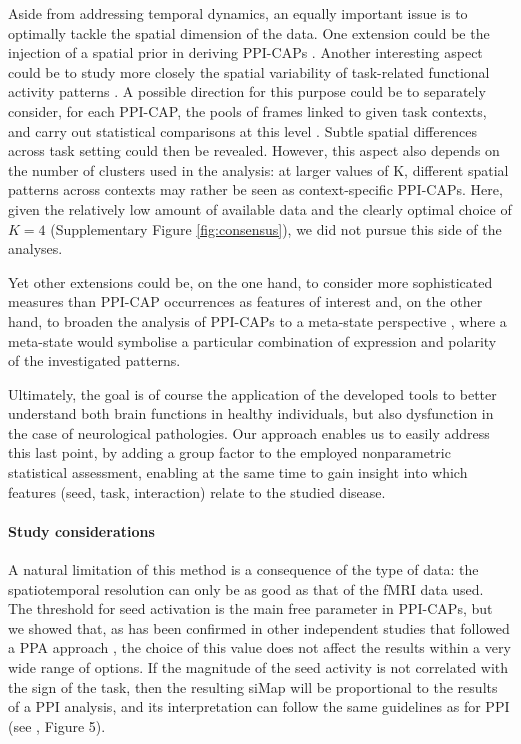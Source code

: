 Aside from addressing temporal dynamics, an equally important issue is to optimally tackle the spatial dimension of the data. One extension could be the injection of a spatial prior in deriving PPI-CAPs \citep{Zhuang2018}. Another interesting aspect could be to study more closely the spatial variability of task-related functional activity patterns \citep{Kiviniemi2011}. A possible direction for this purpose could be to separately consider, for each PPI-CAP, the pools of frames linked to given task contexts, and carry out statistical comparisons at this level \citep{Amico2014}. Subtle spatial differences across task setting could then be revealed. However, this aspect also depends on the number of clusters used in the analysis: at larger values of K, different spatial patterns across contexts may rather be seen as context-specific PPI-CAPs. Here, given the relatively low amount of available data and the clearly optimal choice of $K=4$ (Supplementary Figure \ref{fig:consensus}), we did not pursue this side of the analyses.


Yet other extensions could be, on the one hand, to consider more sophisticated measures than PPI-CAP occurrences as features of interest \citep{Chen2015} and, on the other hand, to broaden the analysis of PPI-CAPs to a meta-state perspective \citep{Miller2016,Vidaurre2017}, where a meta-state would symbolise a particular combination of expression and polarity of the investigated patterns.

Ultimately, the goal is of course the application of the developed tools to better understand both brain functions in healthy individuals, but also dysfunction in the case of neurological pathologies. Our approach enables us to easily address this last point, by adding a group factor to the employed nonparametric statistical assessment, enabling at the same time to gain insight into which features (seed, task, interaction) relate to the studied disease.



\paragraph{Study considerations} 

A  natural limitation of this method is a consequence of the type of data: the spatiotemporal resolution can only be as good as that of the fMRI data used. The threshold for seed activation is the main free parameter in PPI-CAPs, but we showed that, as has been confirmed in other independent studies that followed a PPA approach \citep{Liu2013a,Tagliazucchi2012}, the choice of this value does not affect the results within a very wide range of options. If the magnitude of the seed activity is not correlated with the sign of the task,  then the resulting siMap will be proportional to the results of a PPI analysis, and its interpretation can follow the same guidelines as for PPI (see \citeauthor{Friston1997}, \citeyear{Friston1997} Figure 5). 

